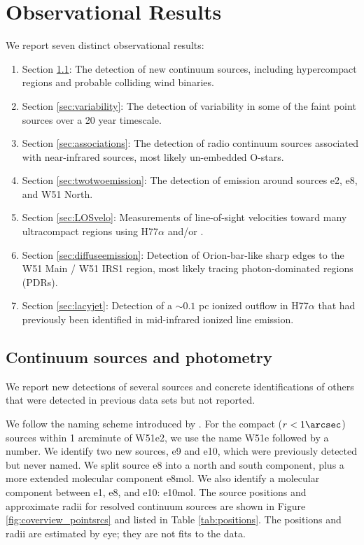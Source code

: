 \section{Observational Results}
\label{sec:results}
We report seven distinct observational results: 
\begin{enumerate}
    \item Section \ref{sec:pointsources}: The detection of new continuum
        sources, including hypercompact \hii regions and probable
        colliding wind binaries. 
    \item Section \ref{sec:variability}: The detection of variability in
        some of the faint point sources over a 20 year timescale.
    \item Section \ref{sec:associations}: The detection of radio continuum
        sources associated with near-infrared sources, most likely un-embedded
        O-stars.
    \item Section \ref{sec:twotwoemission}: The detection of \formaldehyde
        \twotwo emission around sources e2, e8, and W51 North.
    \item Section \ref{sec:LOSvelo}: Measurements of line-of-sight velocities
        toward many ultracompact \hii regions using H77$\alpha$ and/or
        \formaldehyde.
    \item Section \ref{sec:diffuseemission}: Detection of Orion-bar-like sharp
        edges to the W51 Main / W51 IRS1 \hii region, most likely tracing 
        photon-dominated regions (PDRs).
    \item Section \ref{sec:lacyjet}: Detection of a $\sim0.1$ pc ionized
        outflow in H77$\alpha$ that had previously been identified in
        mid-infrared ionized line emission.
\end{enumerate}

\subsection{Continuum sources and photometry}
\label{sec:pointsources}
We report new detections of several sources and concrete
identifications of others that were detected in previous data sets but not
reported.

We follow the naming scheme introduced by \citet{Mehringer1994a}.  For the
compact ($r<1\arcsec$) sources within 1 arcminute of W51e2, we use the name
W51e followed by a number.  We identify two new sources, e9  and e10, which
were previously detected but never named.  We split source e8 into a north and
south component, plus a more extended molecular component e8mol.  We also
identify a molecular component between e1, e8, and e10: e10mol.  The source
positions and approximate radii for resolved continuum sources are shown in Figure
\ref{fig:coverview_pointsrcs} and listed in Table \ref{tab:positions}.
The positions and radii are estimated by eye; they are not fits to the data.

